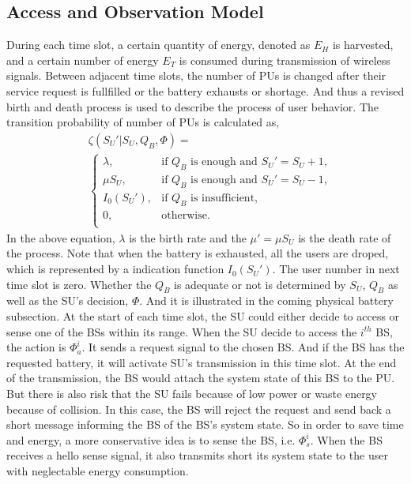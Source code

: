 \documentclass[conference]{IEEEtran}
\begin{document}
\subsection{Access and Observation Model}
During each time slot, a certain quantity of energy, denoted as \(E_H\) is harvested, 
and a certain number of energy \(E_T\) is consumed during transmission of wireless signals.
Between adjacent time slots,
the number of PUs is changed after their service request is fullfilled or the battery exhausts or shortage.
And thus a revised birth and death process is used to describe the process of user behavior. 
The transition probability of number of PUs is calculated as,
\begin{align}\label{formula1} 
&\zeta\left(S_U'| S_U, Q_B, \Phi\right) = \nonumber\\
&\begin{cases}
	\lambda, &\mbox{if $Q_B$ is enough and $S_U' = S_U + 1$,}\\
	\mu S_U, &\mbox{if $Q_B$ is enough and $S_U' = S_U - 1$,}\\
	I_0\left(S_U'\right), &\mbox{if $Q_B$ is insufficient,}\\
	0, &\mbox{otherwise.}\\
\end{cases}
\end{align}
In the above equation, \(\lambda\) is the birth rate and the \(\mu' = \mu S_U\) is the death rate of the process.
Note that when the battery is exhausted, all the users are droped, 
which is represented by a indication function \(I_0\left(S_U'\right)\).
The user number in next time slot is zero. 
Whether the \(Q_B\) is adequate or not is determined by \(S_U\), \(Q_B\) as well as the SU's decision, \(\Phi\). 
And it is illustrated in the coming physical battery subsection.
At the start of each time slot, the SU could either decide to access or sense one of the BSs within its range. 
When the SU decide to access the \(i^{th}\) BS, the action is \(\Phi_{a}^i\).
It sends a request signal to the chosen BS.
And if the BS has the requested battery, it will activate SU's transmission in this time slot.
At the end of the transmission, the BS would attach the system state of this BS to the PU.
But there is also risk that the SU fails because of low power or waste energy because of collision.
In this case, the BS will reject the request and send back a short message informing the BS of the BS's system state.
So in order to save time and energy, a more conservative idea is to sense the BS, i.e. \(\Phi_{s}^i\).
When the BS receives a hello sense signal, 
it also transmits short its system state to the user with neglectable energy consumption.
\end{document}
